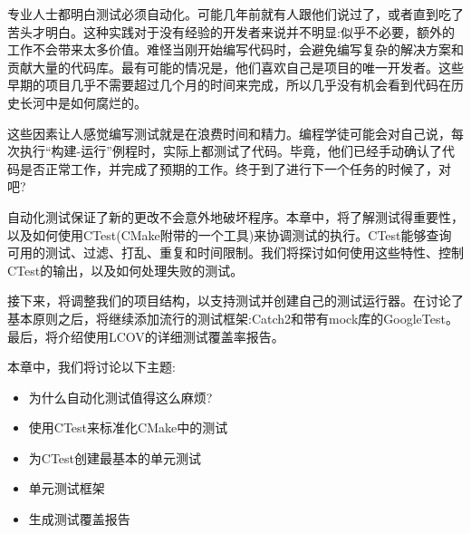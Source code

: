 专业人士都明白测试必须自动化。可能几年前就有人跟他们说过了，或者直到吃了苦头才明白。这种实践对于没有经验的开发者来说并不明显:似乎不必要，额外的工作不会带来太多价值。难怪当刚开始编写代码时，会避免编写复杂的解决方案和贡献大量的代码库。最有可能的情况是，他们喜欢自己是项目的唯一开发者。这些早期的项目几乎不需要超过几个月的时间来完成，所以几乎没有机会看到代码在历史长河中是如何腐烂的。

这些因素让人感觉编写测试就是在浪费时间和精力。编程学徒可能会对自己说，每次执行“构建-运行”例程时，实际上都测试了代码。毕竟，他们已经手动确认了代码是否正常工作，并完成了预期的工作。终于到了进行下一个任务的时候了，对吧?

自动化测试保证了新的更改不会意外地破坏程序。本章中，将了解测试得重要性，以及如何使用CTest(CMake附带的一个工具)来协调测试的执行。CTest能够查询可用的测试、过滤、打乱、重复和时间限制。我们将探讨如何使用这些特性、控制CTest的输出，以及如何处理失败的测试。

接下来，将调整我们的项目结构，以支持测试并创建自己的测试运行器。在讨论了基本原则之后，将继续添加流行的测试框架:Catch2和带有mock库的GoogleTest。最后，将介绍使用LCOV的详细测试覆盖率报告。

本章中，我们将讨论以下主题:

\begin{itemize}
\item 
为什么自动化测试值得这么麻烦?

\item 
使用CTest来标准化CMake中的测试

\item 
为CTest创建最基本的单元测试

\item 
单元测试框架

\item 
生成测试覆盖报告
\end{itemize}






















